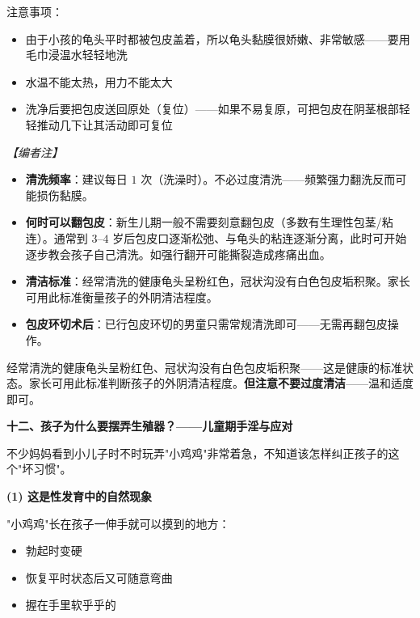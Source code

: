\begin{enumerate}
注意事项：
\begin{itemize}
	\item 由于小孩的龟头平时都被包皮盖着，所以龟头黏膜很娇嫩、非常敏感——要用毛巾浸温水轻轻地洗
	\item 水温不能太热，用力不能太大
	\item 洗净后要把包皮送回原处（复位）——如果不易复原，可把包皮在阴茎根部轻轻推动几下让其活动即可复位
\end{itemize}

\vspace{0.3em}
\noindent\textit{【编者注】}
\begin{itemize}
	\item \textbf{清洗频率}：建议每日 $1$ 次（洗澡时）。不必过度清洗——频繁强力翻洗反而可能损伤黏膜。
	\item \textbf{何时可以翻包皮}：新生儿期一般不需要刻意翻包皮（多数有生理性包茎/粘连）。通常到 $3$--$4$ 岁后包皮口逐渐松弛、与龟头的粘连逐渐分离，此时可开始逐步教会孩子自己清洗。如强行翻开可能撕裂造成疼痛出血。
	\item \textbf{清洁标准}：经常清洗的健康龟头呈粉红色，冠状沟没有白色包皮垢积聚。家长可用此标准衡量孩子的外阴清洁程度。
	\item \textbf{包皮环切术后}：已行包皮环切的男童只需常规清洗即可——无需再翻包皮操作。
\end{itemize}

\begin{tcolorbox}[colback=pink!5!white,colframe=red!50!black,title=贴心小叮咛]
经常清洗的健康龟头呈粉红色、冠状沟没有白色包皮垢积聚——这是健康的标准状态。家长可用此标准判断孩子的外阴清洁程度。\textbf{但注意不要过度清洁}——温和适度即可。
\end{tcolorbox}

\vspace{0.8em}
\noindent\textbf{十二、孩子为什么要摆弄生殖器？——儿童期手淫与应对}

不少妈妈看到小儿子时不时玩弄"小鸡鸡"非常着急，不知道该怎样纠正孩子的这个"坏习惯"。

\vspace{0.3em}
\noindent\textbf{(1) 这是性发育中的自然现象}

"小鸡鸡"长在孩子一伸手就可以摸到的地方：
\begin{itemize}
	\item 勃起时变硬
	\item 恢复平时状态后又可随意弯曲
	\item 握在手里软乎乎的
\end{itemize}


\end{enumerate}
